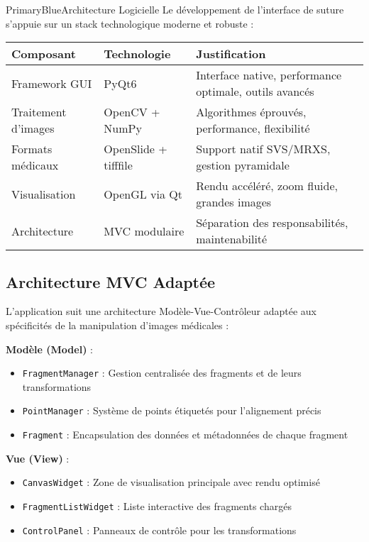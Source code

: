 \documentclass[11pt,a4paper]{article}
\begin{document}
\begin{sectionbox}{PrimaryBlue}{Architecture Logicielle}
Le développement de l'interface de suture s'appuie sur un stack technologique moderne et robuste :

\begin{center}
\begin{tabular}{|l|l|p{6cm}|}
\hline
\rowcolor{LightGray}
\textbf{Composant} & \textbf{Technologie} & \textbf{Justification} \\
\hline
Framework GUI & PyQt6 & Interface native, performance optimale, outils avancés \\
\hline
Traitement d'images & OpenCV + NumPy & Algorithmes éprouvés, performance, flexibilité \\
\hline
Formats médicaux & OpenSlide + tifffile & Support natif SVS/MRXS, gestion pyramidale \\
\hline
Visualisation & OpenGL via Qt & Rendu accéléré, zoom fluide, grandes images \\
\hline
Architecture & MVC modulaire & Séparation des responsabilités, maintenabilité \\
\hline
\end{tabular}
\end{center}

\subsection{Architecture MVC Adaptée}

L'application suit une architecture Modèle-Vue-Contrôleur adaptée aux spécificités de la manipulation d'images médicales :

\textbf{Modèle (Model)} :
\begin{itemize}[leftmargin=*]
    \item \texttt{FragmentManager} : Gestion centralisée des fragments et de leurs transformations
    \item \texttt{PointManager} : Système de points étiquetés pour l'alignement précis
    \item \texttt{Fragment} : Encapsulation des données et métadonnées de chaque fragment
\end{itemize}

\textbf{Vue (View)} :
\begin{itemize}[leftmargin=*]
    \item \texttt{CanvasWidget} : Zone de visualisation principale avec rendu optimisé
    \item \texttt{FragmentListWidget} : Liste interactive des fragments chargés
    \item \texttt{ControlPanel} : Panneaux de contrôle pour les transformations
\end{itemize}


\end{sectionbox}
\end{document}
